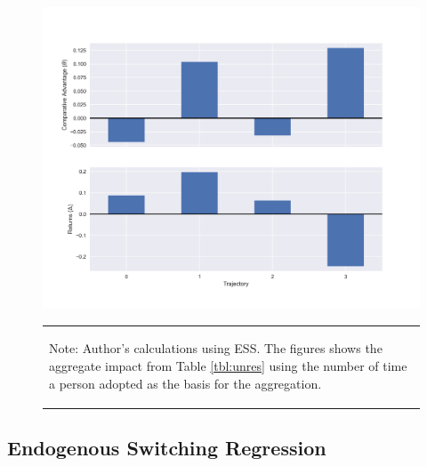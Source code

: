 \documentclass[11pt]{article}
\begin{document}
\begin{figure}
    \centering
    \caption{Aggregation Results: Comparative Advantage and Returns by the Number of Times Adopted (Dry Cropcuts)}
    \label{fig:n_adopt}
    \includegraphics[scale=0.75]{results/figures/num_adoption.png}
    \vspace*{-2em}
    \begin{table}[H]
        \centering
        \begin{tabular}{p{}} 
            \begin{tablenotes}
                  \small
                  \item Note: Author's calculations using ESS. The figures shows the aggregate impact from Table \ref{tbl:unres} using the number of time a person adopted as the basis for the aggregation.
            \end{tablenotes}
        \end{tabular}
    \end{table}
\end{figure}



\subsection{Endogenous Switching Regression}
\end{document}

